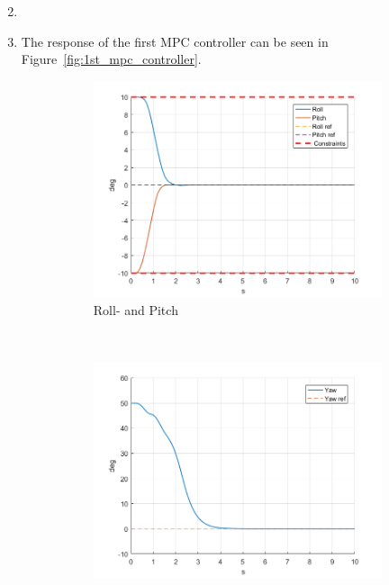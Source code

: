 \documentclass[11pt]{article}
\begin{document}
\begin{enumerate}
    \setcounter{enumi}{1}
    \item

    \item The response of the first MPC controller can be seen in
    Figure~\ref{fig:1st_mpc_controller}.
    \begin{figure}[ht]
        \centering
        \begin{subfigure}[c]{0.3\linewidth}
            \centering
            \includegraphics[width=\linewidth]{Plots_03_FirstMPCController/01}
            \caption{Roll- and Pitch}
        \end{subfigure}
        ~
        \begin{subfigure}[c]{0.3\linewidth}
            \centering
            \includegraphics[width=\linewidth]{Plots_03_FirstMPCController/02}

\end{subfigure}
\end{figure}
\end{enumerate}
\end{document}
